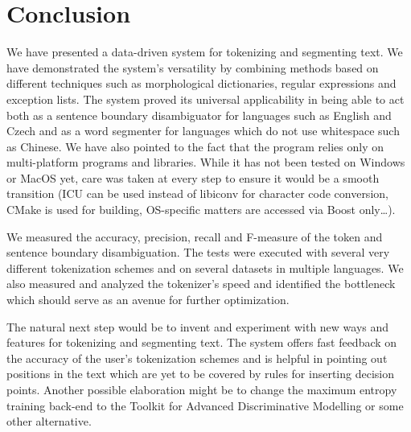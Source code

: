 \chapter*{Conclusion}

We have presented a data-driven system for tokenizing and segmenting text. We
have demonstrated the system's versatility by combining methods based on
different techniques such as morphological dictionaries, regular expressions
and exception lists. The system proved its universal applicability in being
able to act both as a sentence boundary disambiguator for languages such as
English and Czech and as a word segmenter for languages which do not use
whitespace such as Chinese. We have also pointed to the fact that the program
relies only on multi-platform programs and libraries. While it has not been
tested on Windows or MacOS yet, care was taken at every step to ensure it would
be a smooth transition (ICU can be used instead of libiconv for character code
conversion, CMake is used for building, OS-specific matters are accessed via
Boost only\ldots).

We measured the accuracy, precision, recall and F-measure of the token and
sentence boundary disambiguation. The tests were executed with several very
different tokenization schemes and on several datasets in multiple languages.
We also measured and analyzed the tokenizer's speed and identified the
bottleneck which should serve as an avenue for further optimization.

The natural next step would be to invent and experiment with new ways and
features for tokenizing and segmenting text. The system offers fast feedback on
the accuracy of the user's tokenization schemes and is helpful in pointing out
positions in the text which are yet to be covered by rules for inserting
decision points. Another possible elaboration might be to change the maximum
entropy training back-end to the Toolkit for Advanced Discriminative Modelling
or some other alternative.
